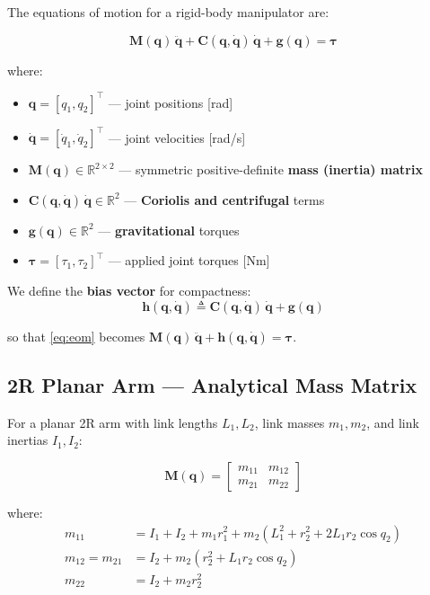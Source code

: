 \documentclass[11pt,a4paper]{article}
\newcommand{\bq}{\bm{q}}
\newcommand{\bdq}{\dot{\bm{q}}}
\newcommand{\bddq}{\ddot{\bm{q}}}
\newcommand{\btau}{\bm{\tau}}
\newcommand{\bM}{\bm{M}}
\newcommand{\bh}{\bm{h}}
\begin{document}
The equations of motion for a rigid-body manipulator are:

\begin{equation}
\boxed{
\bM(\bq)\,\bddq + \bm{C}(\bq, \bdq)\,\bdq + \bm{g}(\bq) = \btau
}
\label{eq:eom}
\end{equation}

where:
\begin{itemize}[leftmargin=2em]
    \item $\bq = [q_1, q_2]^\top$ --- joint positions [rad]
    \item $\bdq = [\dot q_1, \dot q_2]^\top$ --- joint velocities [rad/s]
    \item $\bM(\bq) \in \mathbb{R}^{2\times 2}$ --- symmetric positive-definite \textbf{mass (inertia) matrix}
    \item $\bm{C}(\bq, \bdq)\,\bdq \in \mathbb{R}^2$ --- \textbf{Coriolis and centrifugal} terms
    \item $\bm{g}(\bq) \in \mathbb{R}^2$ --- \textbf{gravitational} torques
    \item $\btau = [\tau_1, \tau_2]^\top$ --- applied joint torques [Nm]
\end{itemize}

We define the \textbf{bias vector} for compactness:
\begin{equation}
\bh(\bq, \bdq) \triangleq \bm{C}(\bq, \bdq)\,\bdq + \bm{g}(\bq)
\label{eq:bias}
\end{equation}

so that \eqref{eq:eom} becomes $\bM(\bq)\,\bddq + \bh(\bq, \bdq) = \btau$.

\subsection{2R Planar Arm --- Analytical Mass Matrix}

For a planar 2R arm with link lengths $L_1, L_2$, link masses $m_1, m_2$, and link inertias $I_1, I_2$:

\begin{equation}
\bM(\bq) = \begin{bmatrix}
    m_{11} & m_{12} \\
    m_{21} & m_{22}
\end{bmatrix}
\end{equation}

where:
\begin{align}
    m_{11} &= I_1 + I_2 + m_1 r_1^2 + m_2(L_1^2 + r_2^2 + 2L_1 r_2 \cos q_2) \\
    m_{12} = m_{21} &= I_2 + m_2(r_2^2 + L_1 r_2 \cos q_2) \\
    m_{22} &= I_2 + m_2 r_2^2
    \label{eq:mass_2r}
\end{align}
\end{document}
